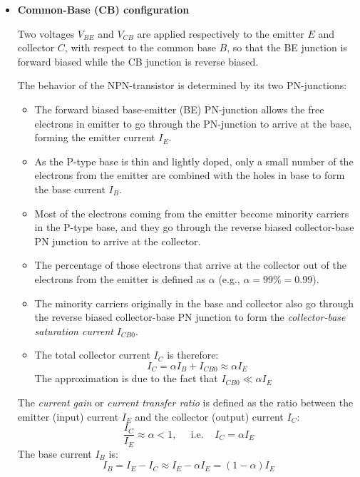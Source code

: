 \begin{itemize}
\item {\bf Common-Base (CB) configuration}

  Two voltages $V_{BE}$ and $V_{CB}$ are applied respectively to the emitter
  $E$ and collector $C$, with respect to the common base $B$, so that the 
  BE junction is forward biased while the CB junction is reverse biased.





  The behavior of the NPN-transistor is determined by its two PN-junctions:

  \begin{itemize}
  \item The forward biased base-emitter (BE) PN-junction allows the free 
    electrons in emitter to go through the PN-junction to arrive at the base,
    forming the emitter current $I_E$.
  \item As the P-type base is thin and lightly doped, only a small number 
    of the electrons from the emitter are combined with the holes in base
    to form the base current $I_B$.
  \item Most of the electrons coming from the emitter become minority 
    carriers in the P-type base, and they go through the reverse biased
    collector-base PN junction to arrive at the collector.
  \item The percentage of those electrons that arrive at the collector out 
    of the electrons from the emitter is defined as $\alpha$ (e.g.,
    $\alpha=99\%=0.99$).
  \item The minority carriers originally in the base and collector also go 
    through the reverse biased collector-base PN junction to form the 
    {\em collector-base saturation current} $I_{CB0}$.
  \item The total collector current $I_C$ is therefore:
    \[
    I_C=\alpha I_B+I_{CB0}\approx \alpha I_E
    \]
    The approximation is due to the fact that $I_{CB0}\ll \alpha I_E$
  \end{itemize}

  The {\em current gain} or {\em current transfer ratio} is defined as the 
  ratio between the emitter (input) current $I_E$ and the collector (output)
  current $I_C$:
  \[ 
  \frac{I_C}{I_E}\approx \alpha <1,\;\;\;\;\;\mbox{i.e.}\;\;\;\; I_C=\alpha I_E
  \]
  The base current $I_B$ is:
  \[
  I_B=I_E-I_C\approx I_E-\alpha I_E=(1-\alpha)I_E 
  \]


\end{itemize}
